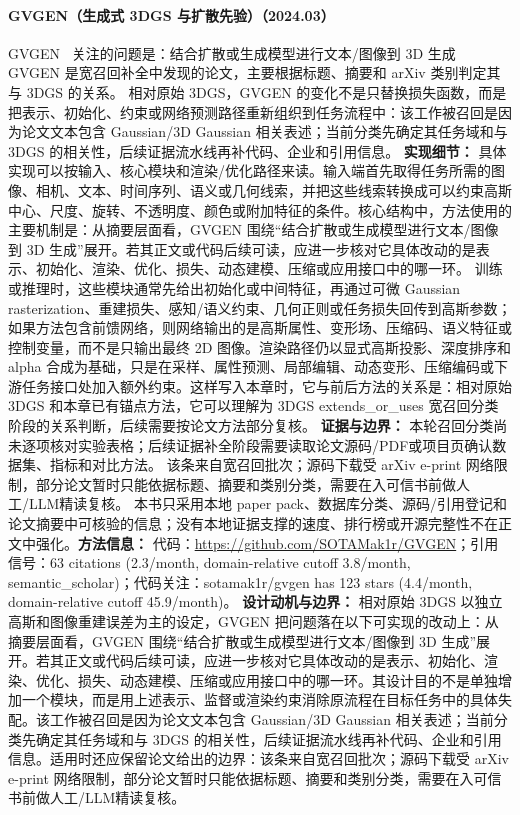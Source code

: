 \paragraph{GVGEN（生成式 3DGS 与扩散先验）（2024.03）}
GVGEN~\cite{2403_12957} 关注的问题是：结合扩散或生成模型进行文本/图像到 3D 生成 GVGEN 是宽召回补全中发现的论文，主要根据标题、摘要和 arXiv 类别判定其与 3DGS 的关系。
相对原始 3DGS，GVGEN 的变化不是只替换损失函数，而是把表示、初始化、约束或网络预测路径重新组织到任务流程中：该工作被召回是因为论文文本包含 Gaussian/3D Gaussian 相关表述；当前分类先确定其任务域和与 3DGS 的相关性，后续证据流水线再补代码、企业和引用信息。
\textbf{实现细节：} 具体实现可以按输入、核心模块和渲染/优化路径来读。输入端首先取得任务所需的图像、相机、文本、时间序列、语义或几何线索，并把这些线索转换成可以约束高斯中心、尺度、旋转、不透明度、颜色或附加特征的条件。核心结构中，方法使用的主要机制是：从摘要层面看，GVGEN 围绕“结合扩散或生成模型进行文本/图像到 3D 生成”展开。若其正文或代码后续可读，应进一步核对它具体改动的是表示、初始化、渲染、优化、损失、动态建模、压缩或应用接口中的哪一环。 训练或推理时，这些模块通常先给出初始化或中间特征，再通过可微 Gaussian rasterization、重建损失、感知/语义约束、几何正则或任务损失回传到高斯参数；如果方法包含前馈网络，则网络输出的是高斯属性、变形场、压缩码、语义特征或控制变量，而不是只输出最终 2D 图像。渲染路径仍以显式高斯投影、深度排序和 alpha 合成为基础，只是在采样、属性预测、局部编辑、动态变形、压缩编码或下游任务接口处加入额外约束。这样写入本章时，它与前后方法的关系是：相对原始 3DGS 和本章已有锚点方法，它可以理解为 3DGS extends\_or\_uses 宽召回分类阶段的关系判断，后续需要按论文方法部分复核。
\textbf{证据与边界：} 本轮召回分类尚未逐项核对实验表格；后续证据补全阶段需要读取论文源码/PDF或项目页确认数据集、指标和对比方法。 该条来自宽召回批次；源码下载受 arXiv e-print 网络限制，部分论文暂时只能依据标题、摘要和类别分类，需要在入可信书前做人工/LLM精读复核。 本书只采用本地 paper pack、数据库分类、源码/引用登记和论文摘要中可核验的信息；没有本地证据支撑的速度、排行榜或开源完整性不在正文中强化。\textbf{方法信息：} 代码：\url{https://github.com/SOTAMak1r/GVGEN}；引用信号：63 citations (2.3/month, domain-relative cutoff 3.8/month, semantic\_scholar)；代码关注：sotamak1r/gvgen has 123 stars (4.4/month, domain-relative cutoff 45.9/month)。
\textbf{设计动机与边界：} 相对原始 3DGS 以独立高斯和图像重建误差为主的设定，GVGEN 把问题落在以下可实现的改动上：从摘要层面看，GVGEN 围绕“结合扩散或生成模型进行文本/图像到 3D 生成”展开。若其正文或代码后续可读，应进一步核对它具体改动的是表示、初始化、渲染、优化、损失、动态建模、压缩或应用接口中的哪一环。其设计目的不是单独增加一个模块，而是用上述表示、监督或渲染约束消除原流程在目标任务中的具体失配。该工作被召回是因为论文文本包含 Gaussian/3D Gaussian 相关表述；当前分类先确定其任务域和与 3DGS 的相关性，后续证据流水线再补代码、企业和引用信息。适用时还应保留论文给出的边界：该条来自宽召回批次；源码下载受 arXiv e-print 网络限制，部分论文暂时只能依据标题、摘要和类别分类，需要在入可信书前做人工/LLM精读复核。
